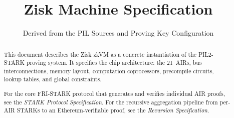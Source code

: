 \documentclass[11pt,a4paper]{article}
\title{Zisk Machine Specification}
\author{Derived from the PIL Sources and Proving Key Configuration}
\date{}
\begin{document}
\maketitle

\begin{abstract}
This document describes the Zisk zkVM as a concrete instantiation of the
PIL2-STARK proving system.
It specifies the chip architecture: the 21~AIRs, bus interconnections,
memory layout, computation coprocessors, precompile circuits,
lookup tables, and global constraints.

For the core FRI-STARK protocol that generates and verifies individual
AIR proofs, see the \emph{STARK Protocol Specification}.
For the recursive aggregation pipeline from per-AIR STARKs to an
Ethereum-verifiable proof, see the \emph{Recursion Specification}.
\end{abstract}

\tableofcontents
\newpage


\end{document}
